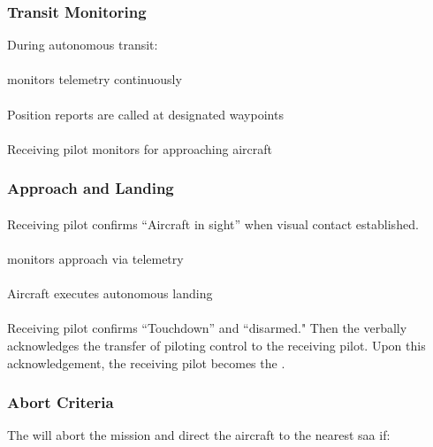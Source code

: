        \subsubsection{Transit Monitoring} During autonomous transit:

            \paragraph{}  monitors telemetry continuously
            \paragraph{} Position reports are called at designated waypoints
            \paragraph{} Receiving pilot monitors for approaching aircraft

        \subsubsection{Approach and Landing}
            \paragraph{} Receiving pilot confirms ``Aircraft in sight'' when visual contact established.
            \paragraph{}  monitors approach via telemetry
            \paragraph{} Aircraft executes autonomous landing
            \paragraph{} Receiving pilot confirms ``Touchdown'' and ``disarmed." Then the  verbally acknowledges the transfer of piloting control to the receiving pilot. Upon this acknowledgement, the receiving pilot becomes the .

        \subsubsection{Abort Criteria} The  will abort the mission and direct the aircraft to the nearest \ac{saa} if:
